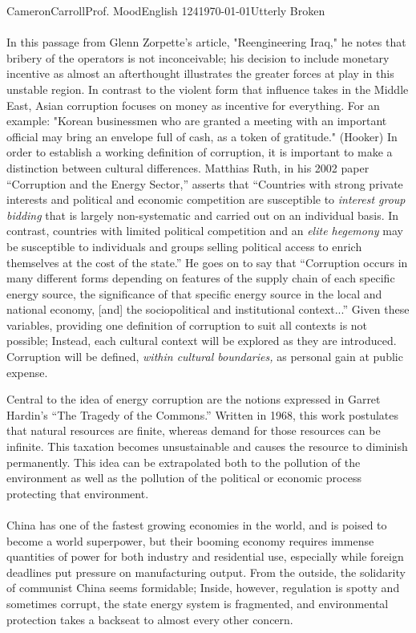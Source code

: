 \begin{mla}{Cameron}{Carroll}{Prof. Mood}{English 124}{\today}{Utterly Broken}
\paragraph{} In this passage from Glenn Zorpette's article, "Reengineering Iraq," he notes that bribery of the operators is not inconceivable; his decision to include monetary incentive as almost an afterthought illustrates the greater forces at play in this unstable region. In contrast to the violent form that influence takes in the Middle East, Asian corruption focuses on money as incentive for everything. For an example: "Korean businessmen who are granted a meeting with an important official may bring an envelope full of cash, as a token of gratitude." (Hooker) In order to establish a working definition of corruption, it is important to make a distinction between cultural differences. Matthias Ruth, in his 2002 paper ``Corruption and the Energy Sector,'' asserts that ``Countries with strong private interests and political and economic competition are susceptible to \emph{interest group bidding} that is largely non-systematic and carried out on an individual basis. In contrast, countries with limited political competition and an \emph{elite hegemony} may be susceptible to individuals and groups selling political access to enrich themselves at the cost of the state.'' He goes on to say that ``Corruption occurs in many different forms depending on features of the supply chain of each specific energy source, the significance of that specific energy source in the local and national economy, [and] the sociopolitical and institutional context...'' Given these variables, providing one definition of corruption to suit all contexts is not possible; Instead, each cultural context will be explored as they are introduced. Corruption will be defined, \emph{within cultural boundaries,} as personal gain at public expense.

 Central to the idea of energy corruption are the notions expressed in Garret Hardin's ``The Tragedy of the Commons.'' Written in 1968, this work postulates that natural resources are finite, whereas demand for those resources can be infinite. This taxation becomes unsustainable and causes the resource to diminish permanently. This idea can be extrapolated both to the pollution of the environment as well as the pollution of the political or economic process protecting that environment.

\vspace{5mm}
\paragraph{} China has one of the fastest growing economies in the world, and is poised to become a world superpower, but their booming economy requires immense quantities of power for both industry and residential use, especially while foreign deadlines put pressure on manufacturing output. From the outside, the solidarity of communist China seems formidable; Inside, however, regulation is spotty and sometimes corrupt, the state energy system is fragmented, and environmental protection takes a backseat to almost every other concern. 


\end{mla}

